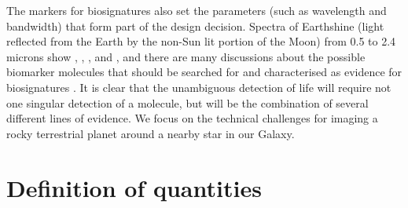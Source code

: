 \documentclass[letterpaper]{ar-1col}
\begin{document}
The markers for biosignatures also set the parameters (such as wavelength and bandwidth) that form part of the design decision.
%
Spectra of Earthshine (light reflected from the Earth by the non-Sun lit portion of the Moon) from 0.5 to 2.4 microns show , , ,  and  \citep{Turnbull06}, and there are many discussions about the possible biomarker molecules that should be searched for and characterised as evidence for biosignatures \citep[see the reviews of ][]{2016AsBio..16..465S,2017ARAA..55..433K,2018AsBio..18..663S}.
%
%
It is clear that the unambiguous detection of life will require not one singular detection of a molecule, but will be the combination of several different lines of evidence.
%
We focus on the technical challenges for imaging a rocky terrestrial planet around a nearby star in our Galaxy.








\section{Definition of quantities}


\end{document}
